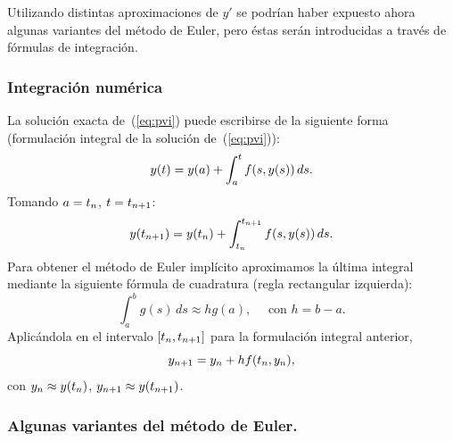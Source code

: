Utilizando distintas aproximaciones de $y'$ se podrían haber expuesto
ahora algunas variantes del método de Euler, pero éstas serán
introducidas a través de fórmulas de integración.

\subsubsection*{Integración numérica}
La solución exacta de~(\ref{eq:pvi}) puede escribirse de la siguiente
forma (formulación integral de la solución de~(\ref{eq:pvi})):
\begin{equation*}
  y(t) = y(a) + \int_a^t f(s,y(s))\, ds.
\end{equation*}
Tomando $a={t_n}$, $t={t_{n+1}}$:
\begin{equation*}
  y({t_{n+1}}) = y({t_n}) + \int_{t_n}^{t_{n+1}} f(s,y(s))\, ds.
\end{equation*}
Para obtener el método de Euler implícito aproximamos la última
integral mediante la siguiente fórmula de cuadratura (regla
rectangular izquierda):
\begin{equation*}
  \int_a^b g(s)\,ds \approx hg(a), \quad \text{ con $h=b-a$}.
\end{equation*}
Aplicándola en el intervalo $[{t_n},{t_{n+1}}]$ para la formulación integral
anterior,
\begin{equation*}
  {y_{n+1}} =  {y_n} + h f({t_n},{y_n}),
\end{equation*}
con ${y_n}\approx y({t_n})$, ${y_{n+1}}\approx y({t_{n+1}})$.

\subsubsection*{Algunas variantes del método de Euler.}

